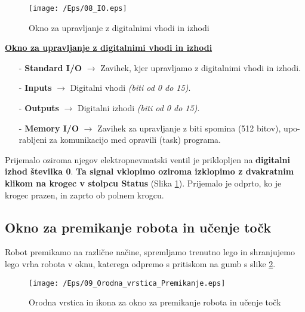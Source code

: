 \begin{figure}[h]
    \centering
    \texttt{[image: /Eps/08\_IO.eps]}
    \vspace{-0.3cm}
    \caption{Okno za upravljanje z digitalnimi vhodi in izhodi}
    \label{fOrodnaVrsticaIOOkno}
\end{figure}


\noindent %
\textbf{\underline{Okno za upravljanje z digitalnimi vhodi in izhodi}} %
\\
\begin{enumerate}
    \item[-] \textbf{Standard I/O} $\longrightarrow$ Zavihek, kjer upravljamo z digitalnimi vhodi in izhodi. %
    \item[-] \textbf{Inputs} $\longrightarrow$ Digitalni vhodi \emph{(biti od 0 do 15)}. %
    \item[-] \textbf{Outputs} $\longrightarrow$ Digitalni izhodi \emph{(biti od 0 do 15)}. %
    \item[-] \textbf{Memory I/O} $\longrightarrow$ Zavihek za upravljanje z biti spomina (512 bitov), upo-\\%
        \hspace*{2.7cm}    rabljeni za komunikacijo med opravili (task) programa. %
\end{enumerate}


Prijemalo oziroma njegov elektropnevmatski ventil je priklopljen
na \textbf{digitalni izhod številka 0}. \textbf{Ta signal vklopimo
oziroma izklopimo z dvakratnim klikom na krogec v stolpcu Status}
(Slika \ref{fOrodnaVrsticaIOOkno}). Prijemalo je odprto, ko je
krogec prazen, in zaprto ob polnem krogcu.








\vspace{0.2cm}
\subsection{Okno za premikanje robota in učenje točk}

Robot premikamo na različne načine, spremljamo trenutno lego in
shranjujemo lego vrha robota v oknu, katerega odpremo s pritiskom na
gumb s slike \ref{fOrodnaVrsticaPremikanje}.
\vspace{0.2cm} %
\begin{figure}[h]
    \centering
    \texttt{[image: /Eps/09\_Orodna\_vrstica\_Premikanje.eps]}
    \vspace{-0.9cm}
    \caption{Orodna vrstica in ikona za okno za premikanje robota in učenje točk}
    \label{fOrodnaVrsticaPremikanje}
\end{figure}

